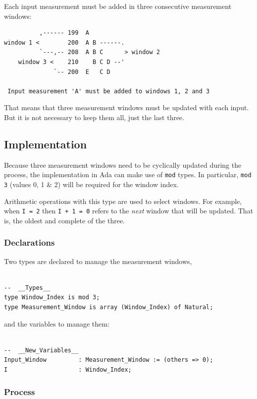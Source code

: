 \documentclass[11pt]{article}
\begin{document}
Each input measurement must be added in three consecutive measurement windows:

\begin{verbatim}
          ,------ 199  A
window 1 <        200  A B ------.
          `---,-- 208  A B C      > window 2
    window 3 <    210    B C D --'
              `-- 200  E   C D

 Input measurement 'A' must be added to windows 1, 2 and 3
\end{verbatim}

That means that three measurement windows must be updated with each input. But
it is not necessary to keep them all, just the last three.

\subsection{Implementation}
\label{sec:org9f3ec32}
Because three measurement windows need to be cyclically updated during the
process, the implementation in Ada can make use of \texttt{mod} types. In particular,
\texttt{mod 3} (values 0, 1 \& 2) will be required for the window index.

Arithmetic operations with this type are used to select windows. For example,
when \texttt{I = 2} then \texttt{I + 1 = 0} refers to the \emph{next} window that will be updated.
That is, the oldest and complete of the three.

\subsubsection{Declarations}
\label{sec:org15bafaf}
Two types are declared to manage the measurement windows,

\begin{verbatim}

--  __Types__
type Window_Index is mod 3;
type Measurement_Window is array (Window_Index) of Natural;

\end{verbatim}

and the variables to manage them:

\begin{verbatim}

--  __New_Variables__
Input_Window         : Measurement_Window := (others => 0);
I                    : Window_Index;

\end{verbatim}

\subsubsection{Process}
\label{sec:org0dfaa22}
\end{document}
